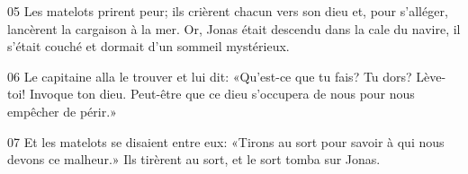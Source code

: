 
05 Les matelots prirent peur; ils crièrent chacun vers son dieu et, pour s’alléger, lancèrent la cargaison à la mer. Or, Jonas était descendu dans la cale du navire, il s’était couché et dormait d’un sommeil mystérieux.

06 Le capitaine alla le trouver et lui dit: «Qu’est-ce que tu fais? Tu dors? Lève-toi! Invoque ton dieu. Peut-être que ce dieu s’occupera de nous pour nous empêcher de périr.»

07 Et les matelots se disaient entre eux: «Tirons au sort pour savoir à qui nous devons ce malheur.» Ils tirèrent au sort, et le sort tomba sur Jonas.
